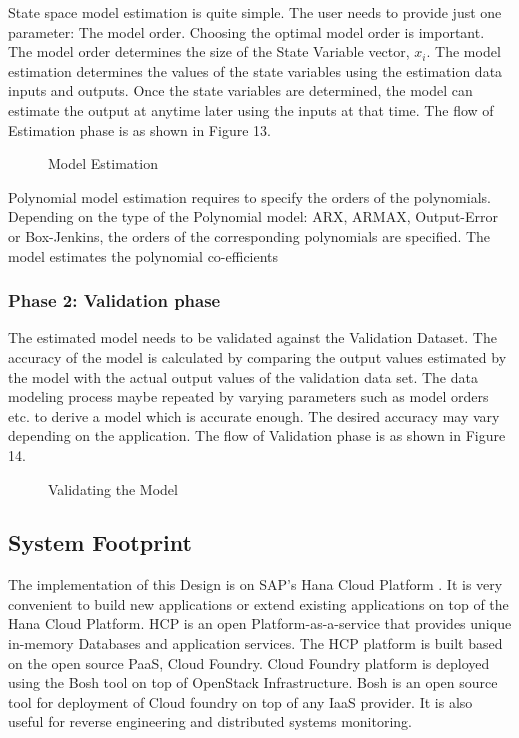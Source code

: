 \documentclass[article,type=msc,colorback,12pt,accentcolor=tud7b,table]{tudthesis}
\begin{document}
 	State space model estimation is quite simple. The user needs to provide just one parameter: The model order. Choosing the optimal model order is important. The model order determines the size of the State Variable vector, $x_i$. The model estimation determines the values of the state variables using the estimation data inputs and outputs. Once the state variables are determined, the model can estimate the output at anytime later using the inputs at that time. The flow of Estimation phase is as shown in Figure 13.
 	
 	 	 \begin{figure}[!h]
 	 	 	\begin{center}
 	 	 		\makebox[\textwidth]{\texttt{[image: C6]}}
 	 	 	\end{center}
 	 	 	\caption{Model Estimation}
 	 	 \end{figure}

Polynomial model estimation requires to specify the orders of the polynomials. Depending on the type of the Polynomial model: ARX, ARMAX, Output-Error or Box-Jenkins,  the orders of the corresponding polynomials are specified. The model estimates the polynomial co-efficients

\subsubsection{Phase 2: Validation phase}

The estimated model needs to be validated against the Validation Dataset. The accuracy of the model is calculated by comparing the output values estimated by the model with the actual output values of the validation data set. The data modeling process maybe repeated by varying parameters such as model orders etc. to derive a model which is accurate enough. The desired accuracy may vary depending on the application. The flow of Validation phase is as shown in Figure 14.

  \begin{figure}[!h]
  	\begin{center}
  		\makebox[\textwidth]{\texttt{[image: C7]}}
  	\end{center}
  	\caption{Validating the Model}
  \end{figure}

\subsection{System Footprint}
	The implementation of this Design is on SAP's Hana Cloud Platform \cite{hcp}. It is very convenient to build new applications or extend existing applications on top of the Hana Cloud Platform. HCP is an open Platform-as-a-service that provides unique in-memory Databases and application services. The HCP platform is built based on the open source PaaS, Cloud Foundry. Cloud Foundry platform is deployed using the Bosh tool on top of OpenStack Infrastructure. Bosh is an open source tool for deployment of Cloud foundry on top of any IaaS provider. It is also useful for reverse engineering and distributed systems monitoring.
	
\end{document}
